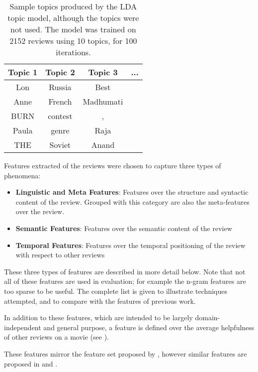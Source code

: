 \documentclass[letter,10pt]{article}
\begin{document}
\begin{table}
\begin{center}
\begin{tabular}{c|c|c|c}
Topic 1 & Topic 2 & Topic 3 & ... \\
\hline
Lon & Russia & Best & \\
Anne & French & Madhumati & \\
BURN & contest & , & \\
Paula & genre & Raja & \\
THE & Soviet & Anand & \\
\end{tabular}
\caption{
\label{topics}
Sample topics produced by the LDA topic model, although the topics were
	not used.
The model was trained on 2152 reviews using 10 topics, for 100 iterations.
}
\end{center}
\end{table}


Features extracted of the reviews were chosen to capture three 
	types of phenomena:
\begin{itemize}
	\item {\bf Linguistic and Meta Features}: Features over the structure and syntactic content of the review.
	Grouped with this category are also the meta-features over the review.
	\item {\bf Semantic Features}: Features over the semantic content of the review
	\item {\bf Temporal Features}: Features over the temporal positioning of the review with respect to other reviews
\end{itemize}

These three types of features are described in more detail below.
Note that not all of these features are used in evaluation;
	for example the n-gram features are too sparse to be useful.
The complete list is given to illustrate techniques attempted, 
	and to compare with the features of previous work.

In addition to these features, which are intended to be largely
	domain-independent and general purpose, a feature is defined over
	the average helpfulness of other reviews on a movie 
	(see ).

These features mirror the feature set proposed by ,
	however similar features are proposed in  and
	.
\end{document}

